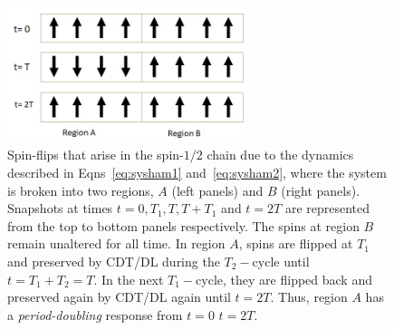 \documentclass[%
nofootinbib,
reprint,
superscriptaddress,
amsmath,amssymb,showkeys,
aps,
prb,
]{revtex4-2}
\begin{document}
	\begin{figure}[t!]
		\centering
		\includegraphics[width=7.0cm]{pic_regions.jpg}
		\caption{Spin-flips that arise in the spin-$1/2$ chain due to the dynamics described in Eqns~\ref{eq:sysham1} and~\ref{eq:sysham2}, where the system is broken into two regions, $A$ (left panels) and $B$ (right panels). Snapshots at times $t=0, T_1, T, T+T_1 $ and $t=2T$ are represented from the top to bottom panels respectively. The spins at region $B$ remain unaltered for all time. In region $A$, spins are flipped at $T_1$ and preserved by CDT/DL during the $T_2-$cycle until $t=T_1+T_2=T$. In the next $T_1-$cycle, they are flipped back and preserved again by CDT/DL again until $t=2T$. Thus, region $A$ has a \textit{period-doubling} response from $t=0$ $t=2T$.}
		\label{Fig:spinflip}
	\end{figure}
\end{document}
